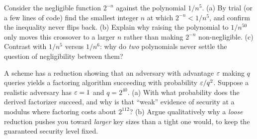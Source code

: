 \begin{exercise}
\label{ch08:ex-12}
Consider the negligible function $2^{-n}$ against the polynomial $1/n^{5}$. (a) By trial (or a few lines of code) find the smallest integer $n$ at which $2^{-n} < 1/n^{5}$, and confirm the inequality never flips back. (b) Explain why raising the polynomial to $1/n^{50}$ only moves this crossover to a larger $n$ rather than making $2^{-n}$ non-negligible. (c) Contrast with $1/n^{5}$ versus $1/n^{6}$: why do \emph{two} polynomials never settle the question of negligibility between them?
\end{exercise}

\begin{exercise}
\label{ch08:ex-10}
A scheme has a reduction showing that an adversary with advantage $\varepsilon$ making $q$ queries yields a factoring algorithm succeeding with probability $\varepsilon / q^{2}$. Suppose a realistic adversary has $\varepsilon = 1$ and $q = 2^{40}$. (a) With what probability does the derived factorizer succeed, and why is that ``weak'' evidence of security at a modulus where factoring costs about $2^{112}$? (b) Argue qualitatively why a \emph{loose} reduction pushes you toward \emph{larger} key sizes than a tight one would, to keep the guaranteed security level fixed.
\end{exercise}
